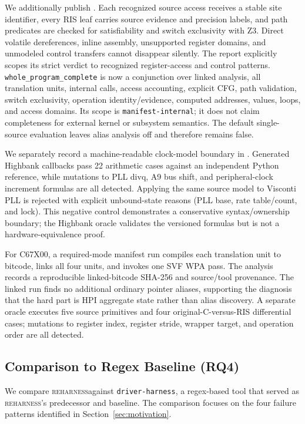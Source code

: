 \documentclass[sigconf,review]{acmart}
\newcommand{\reharness}{\textsc{reharness}}
\begin{document}
We additionally publish . Each recognized source access receives a stable site identifier, every RIS leaf carries source evidence and precision labels, and path predicates are checked for satisfiability and switch exclusivity with Z3. Direct volatile dereferences, inline assembly, unsupported register domains, and unmodeled control transfers cannot disappear silently. The report explicitly scopes its strict verdict to recognized register-access and control patterns. \texttt{whole\_program\_complete} is now a conjunction over linked analysis, all translation units, internal calls, access accounting, explicit CFG, path validation, switch exclusivity, operation identity/evidence, computed addresses, values, loops, and access domains. Its scope is \texttt{manifest-internal}; it does not claim completeness for external kernel or subsystem semantics. The default single-source evaluation leaves alias analysis off and therefore remains false.

We separately record a machine-readable clock-model boundary in . Generated Highbank callbacks pass 22 arithmetic cases against an independent Python reference, while mutations to PLL divq, A9 bus shift, and peripheral-clock increment formulas are all detected. Applying the same source model to Visconti PLL is rejected with explicit unbound-state reasons (PLL base, rate table/count, and lock). This negative control demonstrates a conservative syntax/ownership boundary; the Highbank oracle validates the versioned formulas but is not a hardware-equivalence proof.

For C67X00, a required-mode manifest run compiles each translation unit to bitcode, links all four units, and invokes one SVF WPA pass. The analysis records a reproducible linked-bitcode SHA-256 and source/tool provenance. The linked run finds no additional ordinary pointer aliases, supporting the diagnosis that the hard part is HPI aggregate state rather than alias discovery. A separate oracle executes five source primitives and four original-C-versus-RIS differential cases; mutations to register index, register stride, wrapper target, and operation order are all detected.

\subsection{Comparison to Regex Baseline (RQ4)}

We compare \reharness against \texttt{driver-harness}, a regex-based tool that served as \reharness's predecessor and baseline. The comparison focuses on the four failure patterns identified in Section~\ref{sec:motivation}.
\end{document}
